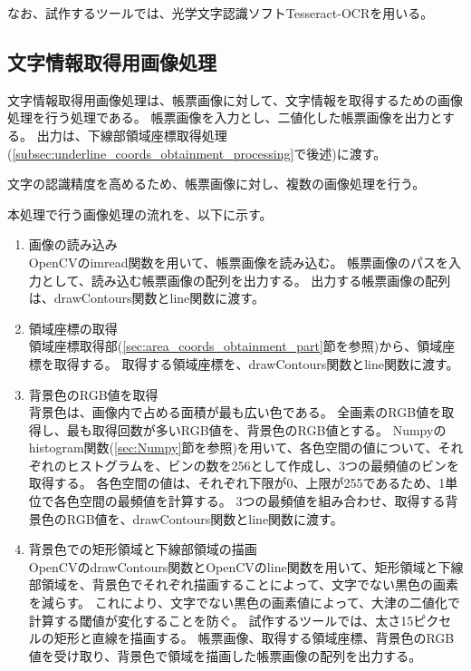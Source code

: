 なお、試作するツールでは、光学文字認識ソフトTesseract-OCR\cite{Tesseract-OCR}を用いる。

\subsection{文字情報取得用画像処理}\label{subsec:image_processing_for_char_recognition}
文字情報取得用画像処理は、帳票画像に対して、文字情報を取得するための画像処理を行う処理である。
帳票画像を入力とし、二値化した帳票画像を出力とする。
出力は、下線部領域座標取得処理(\ref{subsec:underline_coords_obtainment_processing}で後述)に渡す。

文字の認識精度を高めるため、帳票画像に対し、複数の画像処理を行う。

本処理で行う画像処理の流れを、以下に示す。

\begin{enumerate}
    \item 画像の読み込み\\
        OpenCVのimread関数を用いて、帳票画像を読み込む。
        帳票画像のパスを入力として、読み込む帳票画像の配列を出力する。
        出力する帳票画像の配列は、drawContours関数とline関数に渡す。
    \item 領域座標の取得\\
        領域座標取得部(\ref{sec:area_coords_obtainment_part}節を参照)から、領域座標を取得する。
        取得する領域座標を、drawContours関数とline関数に渡す。
    \item 背景色のRGB値を取得\\
        背景色は、画像内で占める面積が最も広い色である。
        全画素のRGB値を取得し、最も取得回数が多いRGB値を、背景色のRGB値とする。
        Numpyのhistogram関数(\ref{sec:Numpy}節を参照)を用いて、各色空間の値について、それぞれのヒストグラムを、ビンの数を256として作成し、3つの最頻値のビンを取得する。
        各色空間の値は、それぞれ下限が0、上限が255であるため、1単位で各色空間の最頻値を計算する。
        3つの最頻値を組み合わせ、取得する背景色のRGB値を、drawContours関数とline関数に渡す。
    \item 背景色での矩形領域と下線部領域の描画\\
        OpenCVのdrawContours関数とOpenCVのline関数を用いて、矩形領域と下線部領域を、背景色でそれぞれ描画することによって、文字でない黒色の画素を減らす。
        これにより、文字でない黒色の画素値によって、大津の二値化で計算する閾値が変化することを防ぐ。
        試作するツールでは、太さ15ピクセルの矩形と直線を描画する。
        帳票画像、取得する領域座標、背景色のRGB値を受け取り、背景色で領域を描画した帳票画像の配列を出力する。

\end{enumerate}
